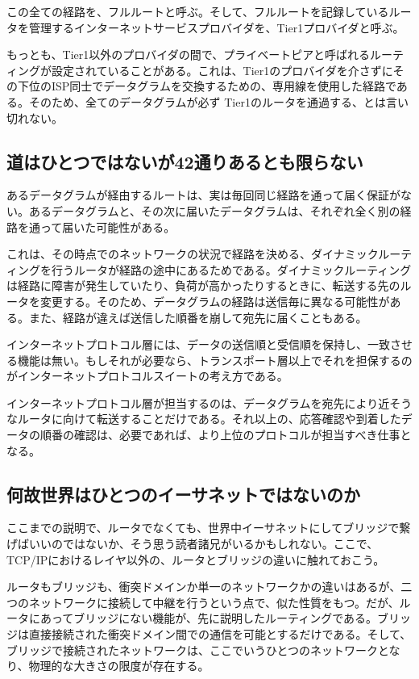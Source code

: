 この全ての経路を、フルルートと呼ぶ。そして、フルルートを記録しているルータを管理するインターネットサービスプロバイダを、Tier1プロバイダと呼ぶ。

もっとも、Tier1以外のプロバイダの間で、プライベートピアと呼ばれるルーティングが設定されていることがある。これは、Tier1のプロバイダを介さずにその下位のISP同士でデータグラムを交換するための、専用線を使用した経路である。そのため、全てのデータグラムが必ず Tier1のルータを通過する、とは言い切れない。


\subsection{道はひとつではないが42通りあるとも限らない}

あるデータグラムが経由するルートは、実は毎回同じ経路を通って届く保証がない。あるデータグラムと、その次に届いたデータグラムは、それぞれ全く別の経路を通って届いた可能性がある。

これは、その時点でのネットワークの状況で経路を決める、ダイナミックルーティングを行うルータが経路の途中にあるためである。ダイナミックルーティングは経路に障害が発生していたり、負荷が高かったりするときに、転送する先のルータを変更する。そのため、データグラムの経路は送信毎に異なる可能性がある。また、経路が違えば送信した順番を崩して宛先に届くこともある。

インターネットプロトコル層には、データの送信順と受信順を保持し、一致させる機能は無い。もしそれが必要なら、トランスポート層以上でそれを担保するのがインターネットプロトコルスイートの考え方である。

インターネットプロトコル層が担当するのは、データグラムを宛先により近そうなルータに向けて転送することだけである。それ以上の、応答確認や到着したデータの順番の確認は、必要であれば、より上位のプロトコルが担当すべき仕事となる。


\subsection{何故世界はひとつのイーサネットではないのか}

ここまでの説明で、ルータでなくても、世界中イーサネットにしてブリッジで繋げばいいのではないか、そう思う読者諸兄がいるかもしれない。ここで、TCP/IPにおけるレイヤ以外の、ルータとブリッジの違いに触れておこう。

ルータもブリッジも、衝突ドメインか単一のネットワークかの違いはあるが、二つのネットワークに接続して中継を行うという点で、似た性質をもつ。だが、ルータにあってブリッジにない機能が、先に説明したルーティングである。ブリッジは直接接続された衝突ドメイン間での通信を可能とするだけである。そして、ブリッジで接続されたネットワークは、ここでいうひとつのネットワークとなり、物理的な大きさの限度が存在する。

